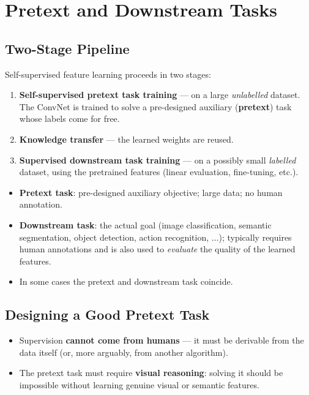 \documentclass[11pt,a4paper]{article}
\theoremstyle{definition}
\theoremstyle{plain}
\theoremstyle{remark}
\begin{document}
\section{Pretext and Downstream Tasks}

\subsection{Two-Stage Pipeline}

Self-supervised feature learning proceeds in two stages:

\begin{tcolorbox}[colback=green!5!white,colframe=green!60!black,title=\textbf{Pretext + Downstream}]
\begin{enumerate}
    \item \textbf{Self-supervised pretext task training} --- on a large \emph{unlabelled} dataset. The ConvNet is trained to solve a pre-designed auxiliary (\textbf{pretext}) task whose labels come for free.
    \item \textbf{Knowledge transfer} --- the learned weights are reused.
    \item \textbf{Supervised downstream task training} --- on a possibly small \emph{labelled} dataset, using the pretrained features (linear evaluation, fine-tuning, etc.).
\end{enumerate}
\end{tcolorbox}

\begin{itemize}
    \item \textbf{Pretext task}: pre-designed auxiliary objective; large data; no human annotation.
    \item \textbf{Downstream task}: the actual goal (image classification, semantic segmentation, object detection, action recognition, $\ldots$); typically requires human annotations and is also used to \emph{evaluate} the quality of the learned features.
    \item In some cases the pretext and downstream task coincide.
\end{itemize}

\subsection{Designing a Good Pretext Task}

\begin{itemize}
    \item Supervision \textbf{cannot come from humans} --- it must be derivable from the data itself (or, more arguably, from another algorithm).
    \item The pretext task must require \textbf{visual reasoning}: solving it should be impossible without learning genuine visual or semantic features.
\end{itemize}
\end{document}
